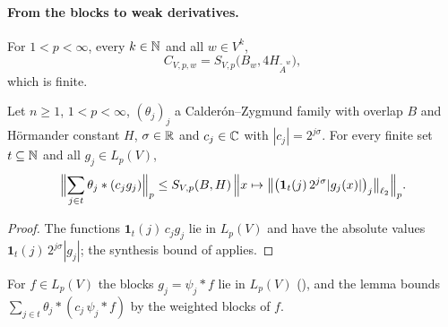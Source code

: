 \paragraph{From the blocks to weak derivatives.}

\begin{definition}
\label{def:tl-to-sobolev-const}
\leanok
{}
For $1 < p < \infty$, every $k \in \mathbb{N}$ and all $w \in V^k$,
\[
  C_{V,p,w} = S_{V,p}\bigl(B_w, 4 H_{\tilde A^w}\bigr) ,
\]
which is finite.
\end{definition}

\begin{lemma}
\label{lem:scaled-synthesis-bound}
\leanok
{}
Let $n \geq 1$, $1 < p < \infty$, $(\theta_j)_j$ a Calder\'on--Zygmund family with overlap $B$ and
H\"ormander constant $H$, $\sigma \in \mathbb{R}$ and $c_j \in \mathbb{C}$ with $|c_j| = 2^{j\sigma}$. For every
finite set $t \subseteq \mathbb{N}$ and all $g_j \in L_p(V)$,
\[
  \Bigl\| \sum_{j \in t} \theta_j * (c_j g_j) \Bigr\|_p
  \leq S_{V,p}(B, H) \, \Bigl\| x \mapsto \bigl\| \bigl(\mathbf 1_t(j) \, 2^{j\sigma}
  |g_j(x)|\bigr)_j \bigr\|_{\ell_2} \Bigr\|_p .
\]
\end{lemma}

\begin{proof}
\leanok
The functions $\mathbf 1_t(j) \, c_j g_j$ lie in $L_p(V)$ and have the absolute values
$\mathbf 1_t(j) \, 2^{j\sigma} |g_j|$; the synthesis bound of 
applies.
\end{proof}

For $f \in L_p(V)$ the blocks $g_j = \psi_j * f$ lie in $L_p(V)$ (),
and the lemma bounds $\sum_{j \in t} \theta_j * (c_j \, \psi_j * f)$ by the weighted blocks of $f$.

